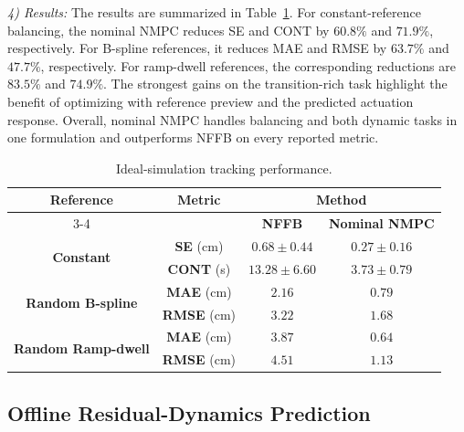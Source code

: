 \documentclass[letterpaper, 10 pt, conference]{ieeeconf}  %
\begin{document}
\textit{4) Results:}
The results are summarized in Table~\ref{tab:ideal_simulation_tracking}. For constant-reference balancing, the nominal NMPC reduces SE and CONT by
$60.8\%$ and $71.9\%$, respectively. For B-spline references, it reduces MAE and RMSE by $63.7\%$ and $47.7\%$,
respectively. For ramp-dwell references, the corresponding reductions are $83.5\%$ and $74.9\%$. The strongest
gains on the transition-rich task highlight the benefit of optimizing with reference preview and the predicted
actuation response. Overall, nominal NMPC handles balancing and both dynamic tasks in one formulation and
outperforms NFFB on every reported metric.

\begin{table}[t]
    \caption{Ideal-simulation tracking performance.}
    \label{tab:ideal_simulation_tracking}
    \centering
    {\footnotesize
    \setlength{\tabcolsep}{4pt}
    \renewcommand{\arraystretch}{1.25}
    \begin{tabular}{|c|c|c|c|}
        \hline
        \multirow{2}{*}{\textbf{Reference}} &
        \multirow{2}{*}{\textbf{Metric}} &
        \multicolumn{2}{c|}{\textbf{Method}} \\
        \cline{3-4}
        & & \textbf{NFFB} & \textbf{Nominal NMPC} \\
        \hline
        \multirow{2}{*}{\textbf{Constant}}
        & \textbf{SE} (cm) & $0.68{\pm}0.44$ & $\mathbf{0.27{\pm}0.16}$ \\
        \cline{2-4}
        & \textbf{CONT} (s) & $13.28{\pm}6.60$ & $\mathbf{3.73{\pm}0.79}$ \\
        \hline
        \multirow{2}{*}{\textbf{Random B-spline}}
        & \textbf{MAE} (cm) & $2.16$ & $\mathbf{0.79}$ \\
        \cline{2-4}
        & \textbf{RMSE} (cm) & $3.22$ & $\mathbf{1.68}$ \\
        \hline
        \multirow{2}{*}{\textbf{Random Ramp-dwell}}
        & \textbf{MAE} (cm) & $3.87$ & $\mathbf{0.64}$ \\
        \cline{2-4}
        & \textbf{RMSE} (cm) & $4.51$ & $\mathbf{1.13}$ \\
        \hline
    \end{tabular}}
\end{table}



\subsection{Offline Residual-Dynamics Prediction}
\end{document}
